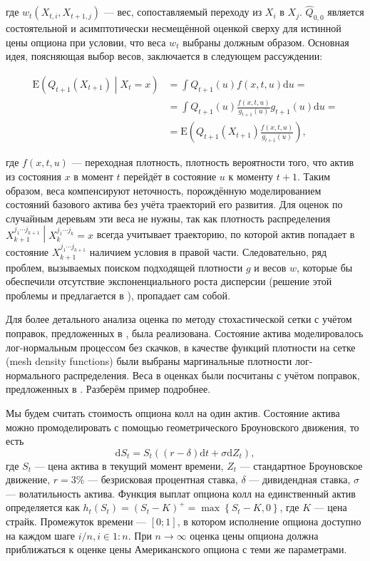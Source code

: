\documentclass[specialist,
               substylefile = ../spbu.rtx,
               subf,href,colorlinks=true, 12pt]{disser}
\newcommand{\ev}{\mathrm{E}}
\begin{document}
где $w_t\left(X_{t, i}, X_{t+1, j}\right)$ --- вес, сопоставляемый переходу из $X_i$ в $X_j$. $\hat Q_{0, 0}$ является состоятельной и асимптотически несмещённой оценкой сверху для истинной цены опциона при условии, что веса $w_t$ выбраны должным образом. Основная идея, поясняющая выбор весов, заключается в следующем рассуждении:

$$\begin{aligned}
\ev\left(Q_{t+1}\left(X_{t+1}\right)\middle\vert X_t = x\right) &= \int Q_{t+1}\left(u\right) f\left(x, t, u\right) \mathrm du = \\ &= \int Q_{t+1}\left(u\right) \frac{f\left(x, t, u\right)}{g_{t+1}\left(u\right)}g_{t+1}\left(u\right) \mathrm du = \\ &= \ev\left(Q_{t+1}\left(X_{t+1}\right) \frac{f\left(x, t, u\right)}{g_{t+1}\left(u\right)}\right),
\end{aligned}$$

где $f\left(x, t, u\right)$ — переходная плотность, плотность вероятности того, что актив из состояния $x$ в момент $t$ перейдёт в состояние $u$ к моменту $t+1$. Таким образом, веса компенсируют неточность, порождённую моделированием состояний базового актива без учёта траекторий его развития. Для оценок по случайным деревьям эти веса не нужны, так как плотность распределения $\left.X_{k+1}^{j_1\cdots j_{k+1}}\middle\vert X_{k}^{j_1\cdots j_{k}} = x\right.$ всегда учитывает траекторию, по которой актив попадает в состояние $X_{k+1}^{j_1\cdots j_{k+1}}$ наличием условия в правой части. Следовательно, ряд проблем, вызываемых поиском подходящей плотности $g$ и весов $w$, которые бы обеспечили отсутствие экспоненциального роста дисперсии (решение этой проблемы и предлагается в \cite{Kashtanov2015}), пропадает сам собой.

Для более детального анализа оценка по методу стохастической сетки с учётом поправок, предложенных в \cite{Kashtanov2015}, была реализована. Состояние актива моделировалось лог-нормальным процессом без скачков, в качестве функций плотности на сетке (mesh density functions) были выбраны маргинальные плотности лог-нормального распределения. Веса в оценках были посчитаны с учётом поправок, предложенных в  \cite{Kashtanov2015}. Разберём пример подробнее.

Мы будем считать стоимость опциона колл на один актив. Состояние актива можно промоделировать с помощью геометрического Броуновского движения, то есть $$\mathrm d S_t = S_t\left((r - \delta)\mathrm dt + \sigma \mathrm d Z_t\right),$$ где $S_t$ --- цена актива в текущий момент времени, $Z_t$ --- стандартное Броуновское движение, $r = 3\%$ --- безрисковая процентная ставка, $\delta$ --- дивидендная ставка, $\sigma$ --- волатильность актива. Функция выплат опциона колл на единственный актив определяется как $h_t\left(S_t\right) = \left(S_t - K\right)^+ = \max\left\lbrace S_t - K, 0\right\rbrace$, где $K$ --- цена страйк. Промежуток времени --- $\left[0;1\right]$, в котором исполнение опциона доступно на каждом шаге $i / n, i\in 1:n$. При $n\to\infty$ оценка цены опциона должна приближаться к оценке цены Американского опциона с теми же параметрами.
\end{document}
